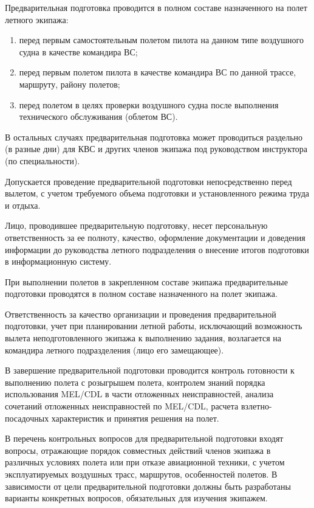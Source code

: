 Предварительная подготовка проводится в полном составе назначенного на полет летного экипажа:
\begin{enumerate}[label=\alph*), ref=\alph*]
    \item перед первым самостоятельным полетом пилота на данном типе воздушного судна в качестве командира ВС; 
    \item перед первым полетом пилота в качестве командира ВС по данной трассе, маршруту, району полетов; 
    \item перед полетом в целях проверки воздушного судна после выполнения технического обслуживания (облетом ВС).
\end{enumerate}

В остальных случаях предварительная подготовка может проводиться раздельно (в разные дни) для КВС и других членов экипажа под руководством инструктора (по специальности).

Допускается проведение предварительной подготовки непосредственно перед вылетом, с учетом требуемого объема подготовки и установленного режима труда и отдыха.

Лицо, проводившее предварительную подготовку, несет персональную ответственность за ее полноту, качество, оформление документации и доведения информации до руководства летного подразделения о внесение итогов подготовки в информационную систему.

При выполнении полетов в закрепленном составе экипажа предварительные подготовки проводятся в полном составе назначенного на полет экипажа.

Ответственность за качество организации и проведения предварительной подготовки, учет при планировании летной работы, исключающий возможность вылета неподготовленного экипажа к выполнению задания, возлагается на командира летного подразделения (лицо его замещающее).

В завершение предварительной подготовки проводится контроль готовности к выполнению полета с розыгрышем полета, контролем знаний порядка использования MEL/CDL в части отложенных неисправностей, анализа сочетаний отложенных неисправностей по MEL/CDL, расчета взлетно-посадочных характеристик и принятия решения на полет. 

В перечень контрольных вопросов для предварительной подготовки входят вопросы, отражающие порядок совместных действий членов экипажа в различных условиях полета или при отказе авиационной техники, с учетом эксплуатируемых воздушных трасс, маршрутов, особенностей полетов. В зависимости от цели предварительной подготовки должны быть разработаны варианты конкретных вопросов, обязательных для изучения экипажем.

